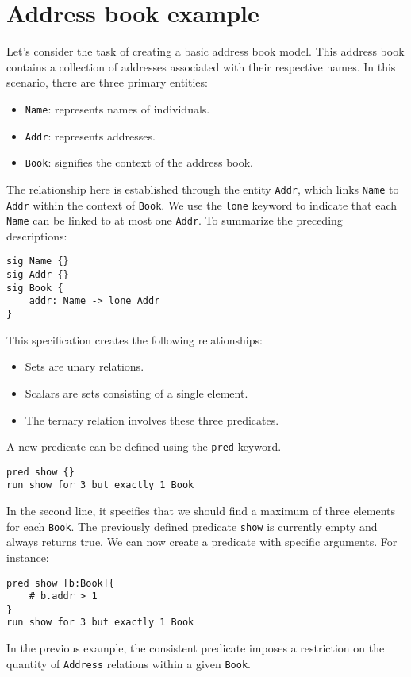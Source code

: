 \section{Address book example}

Let's consider the task of creating a basic address book model. 
This address book contains a collection of addresses associated with their respective names.
In this scenario, there are three primary entities:
\begin{itemize}
    \item \texttt{Name}: represents names of individuals.
    \item \texttt{Addr}: represents addresses.
    \item \texttt{Book}: signifies the context of the address book.
\end{itemize}
The relationship here is established through the entity \texttt{Addr}, which links \texttt{Name} to \texttt{Addr} within the context of \texttt{Book}. 
We use the \texttt{lone} keyword to indicate that each \texttt{Name} can be linked to at most one \texttt{Addr}. 
To summarize the preceding descriptions:
\begin{lstlisting}[language=alloy]
sig Name {}
sig Addr {}
sig Book {
    addr: Name -> lone Addr
}
\end{lstlisting}
This specification creates the following relationships: 
\begin{itemize}
    \item Sets are unary relations.
    \item Scalars are sets consisting of a single element.
    \item The ternary relation involves these three predicates.
\end{itemize}
A new predicate can be defined using the \texttt{pred} keyword.
\begin{lstlisting}[language=alloy]
pred show {}
run show for 3 but exactly 1 Book
\end{lstlisting}
In the second line, it specifies that we should find a maximum of three elements for each \texttt{Book}. 
The previously defined predicate \texttt{show} is currently empty and always returns true.
We can now create a predicate with specific arguments. 
For instance:
\begin{lstlisting}[language=alloy]
pred show [b:Book]{
    # b.addr > 1
}
run show for 3 but exactly 1 Book
\end{lstlisting}
In the previous example, the consistent predicate imposes a restriction on the quantity of \texttt{Address} relations within a given \texttt{Book}. 
